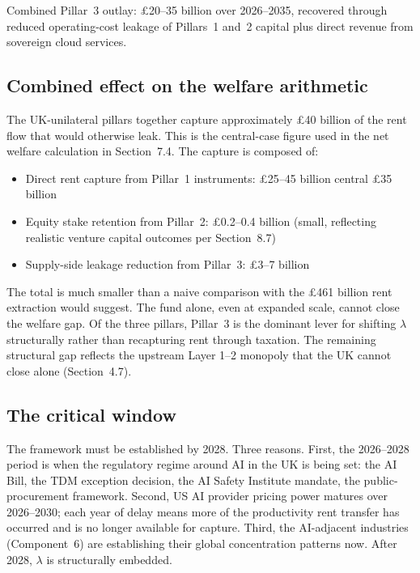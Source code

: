 \documentclass[11pt,letterpaper]{article}
\theoremstyle{remark}
\begin{document}
Combined Pillar~3 outlay: \pounds20--35 billion over 2026--2035, recovered through reduced operating-cost leakage of Pillars~1 and~2 capital plus direct revenue from sovereign cloud services.

\subsection{Combined effect on the welfare arithmetic}

The {UK}-unilateral pillars together capture approximately \pounds40 billion of the rent flow that would otherwise leak. This is the central-case figure used in the net welfare calculation in Section~7.4. The capture is composed of:

\begin{itemize}
\item Direct rent capture from Pillar~1 instruments: \pounds25--45 billion central \pounds35 billion
\item Equity stake retention from Pillar~2: \pounds0.2--0.4 billion (small, reflecting realistic venture capital outcomes per Section~8.7)
\item Supply-side leakage reduction from Pillar~3: \pounds3--7 billion
\end{itemize}

The total is much smaller than a naive comparison with the \pounds461 billion rent extraction would suggest. The fund alone, even at expanded scale, cannot close the welfare gap. Of the three pillars, Pillar~3 is the dominant lever for shifting $\lambda$ structurally rather than recapturing rent through taxation. The remaining structural gap reflects the upstream Layer 1--2 monopoly that the {UK} cannot close alone (Section~4.7).

\subsection{The critical window}

The framework must be established by 2028. Three reasons. First, the 2026--2028 period is when the regulatory regime around {AI} in the {UK} is being set: the {AI} Bill, the {TDM} exception decision, the {AI Safety Institute} mandate, the public-procurement framework. Second, {US} {AI} provider pricing power matures over 2026--2030; each year of delay means more of the productivity rent transfer has occurred and is no longer available for capture. Third, the {AI}-adjacent industries (Component~6) are establishing their global concentration patterns now. After 2028, $\lambda$ is structurally embedded.
\end{document}
